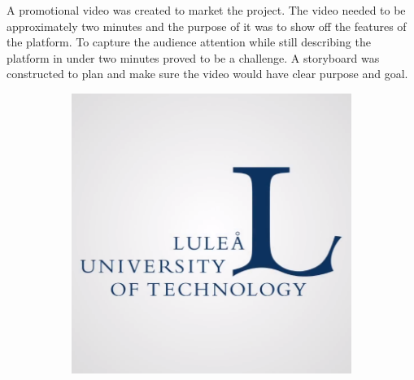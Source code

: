 A promotional video was created to market the project. The video needed to be approximately two minutes and the purpose of it was to show off the features of the platform.
To capture the audience attention while still describing the platform in under two minutes proved to be a challenge. A storyboard was constructed to plan and make sure the video would have clear purpose and goal.


\begin{figure}[ht]
    \centering

    \begin{subfigure}{.3\linewidth}
    \centering
    \includegraphics[width=\linewidth]{img/video_1.png}
    \end{subfigure}
    \hfill
    \begin{subfigure}{.3\linewidth}
    \centering

\end{subfigure}
\end{figure}
